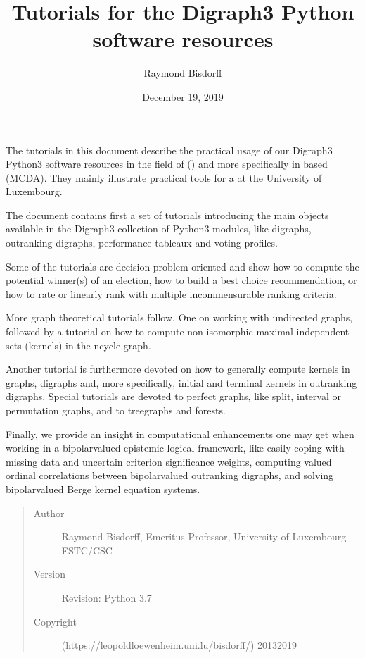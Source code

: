 \documentclass[a4paper,10pt,english]{sphinxhowto}
\title{Tutorials for the Digraph3 Python software resources}
\date{December 19, 2019}
\author{Raymond Bisdorff}
\begin{document}
\pagestyle{empty}
\sphinxmaketitle
\pagestyle{plain}
\sphinxtableofcontents
\pagestyle{normal}
\label{\detokenize{tutorial::doc}}



The tutorials in this document describe the practical usage of our Digraph3 Python3 software resources in the field of  () and more specifically in  based  (MCDA). They mainly illustrate practical tools for a  at the University of Luxembourg.

The document contains first a set of tutorials introducing the main objects available in the Digraph3 collection of Python3 modules, like digraphs, outranking digraphs, performance tableaux and voting profiles.

Some of the tutorials are decision problem oriented and show how to compute the potential winner(s) of an election, how to build a best choice recommendation, or how to rate or linearly rank with multiple incommensurable ranking criteria.

More graph theoretical tutorials follow. One on working with undirected graphs, followed by a tutorial on how to compute non isomorphic maximal independent sets (kernels) in the n\sphinxhyphen{}cycle graph.

Another tutorial is furthermore devoted on how to generally compute kernels in graphs, digraphs and, more specifically, initial and terminal kernels in outranking digraphs. Special tutorials are devoted to perfect graphs, like split, interval or permutation graphs, and to tree\sphinxhyphen{}graphs and forests.

Finally, we provide an insight in computational enhancements one may get when working in a bipolar\sphinxhyphen{}valued epistemic logical framework, like easily coping with missing data and uncertain criterion significance weights, computing valued ordinal correlations between bipolar\sphinxhyphen{}valued outranking digraphs, and solving bipolar\sphinxhyphen{}valued Berge kernel equation systems.
\begin{quote}\begin{description}
\item[{Author}] \leavevmode
Raymond Bisdorff, Emeritus Professor, University of Luxembourg FSTC/CSC

\item[{Version}] \leavevmode
Revision: Python 3.7

\item[{Copyright}] \leavevmode
{} (https://leopold\sphinxhyphen{}loewenheim.uni.lu/bisdorff/) 2013\sphinxhyphen{}2019

\end{description}\end{quote}
\label{\detokenize{tutorial:tutorial-label}}
\end{document}
